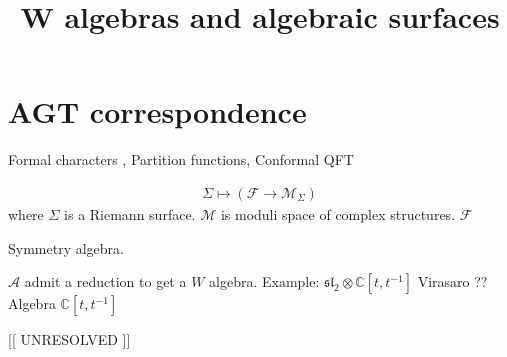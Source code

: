 % 



\title{W algebras and algebraic surfaces}
\author{}
\date{}

 
\maketitle

\section{AGT correspondence} %

Formal characters , Partition functions, Conformal QFT

\begin{align}
    \Sigma \mapsto ( \mathcal{F} \rightarrow \mathcal{M}_\Sigma) 
\end{align}
where $\Sigma $ is a Riemann surface. 
$\mathcal{M} $ is moduli space of complex structures. 
$ \mathcal{F} $ 

Symmetry algebra. 

$\mathcal{A} $ admit a reduction to get a $W$ algebra. 
Example: 
$\mathfrak{sl}_2 \otimes \mathbb{C} [t, t^{-1} ] $ 
Virasaro ?? Algebra $ \mathbb{C} [t, t^{-1} ] $ 



[[ UNRESOLVED ]]






 

